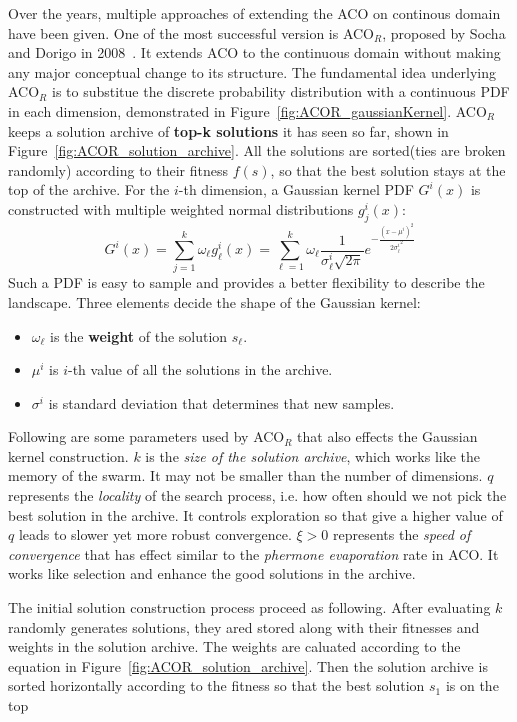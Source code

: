 Over the years, multiple approaches of extending the ACO on continous domain have been given.
One of the most successful version is ACO$_{R}$, proposed by Socha and Dorigo in 2008~\cite{Socha:2008:ACOR}.
It extends ACO to the continuous domain without making any major conceptual change to its structure.
The fundamental idea underlying ACO$_{R}$ is to substitue the discrete probability distribution with a continuous PDF in each dimension, demonstrated in Figure~\ref{fig:ACOR_gaussianKernel}. 
ACO$_R$ keeps a solution archive of \textbf{top-k solutions} it has seen so far, shown in Figure~\ref{fig:ACOR_solution_archive}.
All the solutions are sorted(ties are broken randomly) according to their fitness $f(s)$, 
so that the best solution stays at the top of the archive.
For the $i$-th dimension, a Gaussian kernel PDF $G^i(x)$ is constructed with multiple weighted normal distributions $g_j^i(x)$: 
\begin{displaymath}
G^i(x) = \sum_{j = 1}^{k}\omega_{\ell}g_{\ell}^{i}(x) = 
\sum_{\ell = 1}^{k}\omega_{\ell} \frac{1}{\sigma_{\ell}^{i}\sqrt{2\pi}} e^{-\frac{ (x-\mu^i)^2 }{2 {\sigma^i_\ell}^2}}
\end{displaymath}
Such a PDF is easy to sample and provides a better flexibility to describe the landscape.
Three elements decide the shape of the Gaussian kernel:
\begin{itemize}
\item $\omega_\ell$ is the \textbf{weight} of the solution $s_\ell$.
\item $\mu^i$ is $i$-th value of all the solutions in the archive.
\item $\sigma^i$ is standard deviation that determines that new samples.
\end{itemize}
Following are some parameters used by ACO$_R$ that also effects the Gaussian kernel construction.
$k$ is the \textit{size of the solution archive}, which works like the memory of the swarm.
It may not be smaller than the number of dimensions.
$q$ represents the \textit{locality} of the search process, i.e. how often should we not pick the best solution in the archive.
It controls exploration so that give a higher value of $q$ leads to slower yet more robust convergence.
$\xi > 0$ represents the \textit{speed of convergence} that has effect similar to the \textit{phermone evaporation} rate in ACO.
It works like selection and enhance the good solutions in the archive.

The initial solution construction process proceed as following.
After evaluating $k$ randomly generates solutions, they ared stored along with their fitnesses and weights in the solution archive.
The weights are caluated according to the equation in Figure~\ref{fig:ACOR_solution_archive}.
Then the solution archive is sorted horizontally according to the fitness so that the best solution $s_1$ is on the top

